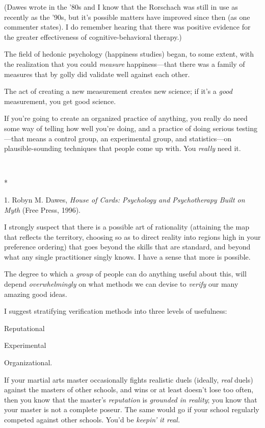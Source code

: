 {
 (Dawes wrote in the '80s and I know that the
Rorschach was still in use as recently as the '90s, but
it's possible matters have improved since then (as one
commenter states). I do remember hearing that there was positive
evidence for the greater effectiveness of cognitive-behavioral
therapy.)}

{
 The field of hedonic psychology (happiness studies) began, to some
extent, with the realization that you could \textit{measure}
happiness---that there was a family of measures that by golly did
validate well against each other.}

{
 The act of creating a new measurement creates new science; if
it's a \textit{good} measurement, you get good
science.}

{
 If you're going to create an organized practice of
anything, you really do need some way of telling how well
you're doing, and a practice of doing serious
testing---that means a control group, an experimental group, and
statistics---on plausible-sounding techniques that people come up with.
You \textit{really} need it.}

{\centering
 \ ~
\par}

{\centering
 *
\par}


\bigskip

{
 1. Robyn M. Dawes, \textit{House of Cards: Psychology and
Psychotherapy Built on Myth} (Free Press, 1996).}


{
 I strongly suspect that there is a possible art of rationality
(attaining the map that reflects the territory, choosing so as to
direct reality into regions high in your preference ordering) that goes
beyond the skills that are standard, and beyond what any single
practitioner singly knows. I have a sense that more is possible. }

{
 The degree to which a \textit{group} of people can do anything
useful about this, will depend \textit{overwhelmingly} on what methods
we can devise to \textit{verify} our many amazing good ideas.}

{
 I suggest stratifying verification methods into three levels of
usefulness:}

{
 Reputational}

{
 Experimental}

{
 Organizational.}

{
 If your martial arts master occasionally fights realistic duels
(ideally, \textit{real} duels) against the masters of other schools,
and wins or at least doesn't lose too often, then you
know that the master's \textit{reputation} is
\textit{grounded in reality}; you know that your master is not a
complete poseur. The same would go if your school regularly competed
against other schools. You'd be
\textit{keepin' it real.}}

